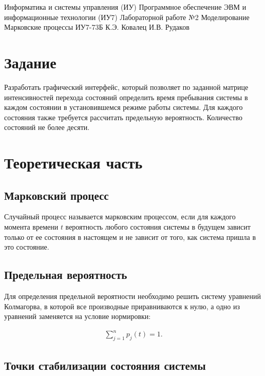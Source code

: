 \documentclass{bmstu}
\begin{document}
\makereporttitle
{Информатика и системы управления (ИУ)}
{Программное обеспечение ЭВМ и информационные технологии (ИУ7)}
{Лабораторной работе №2}
{Моделирование}
{Марковские процессы}
{}
{ИУ7-73Б}
{К.Э. Ковалец}
{И.В. Рудаков}


\setcounter{page}{2}
\renewcommand{\contentsname}{Содержание} 
\tableofcontents

\chapter{Задание}

Разработать графический интерфейс, который позволяет по заданной матрице интенсивностей перехода состояний определить время пребывания системы в каждом состоянии в установившемся режиме работы системы. Для каждого состояния также требуется рассчитать предельную вероятность. Количество состояний не более десяти.


\chapter{Теоретическая часть}

\section{Марковский процесс}

Случайный процесс называется марковским процессом, если для каждого момента времени $t$ вероятность любого состояния системы в будущем зависит только от ее состояния в настоящем и не зависит от того, как система пришла в это состояние.

\section{Предельная вероятность}

Для определения предельной вероятности необходимо решить систему уравнений Колмагорва, в которой все производные приравниваются к нулю, а одно из уравнений заменяется на условие нормировки:

\begin{equation}
    \begin{aligned}
        \sum_{j = 1}^{n} p_{j}(t) = 1.
    \end{aligned}
\end{equation}

\section{Точки стабилизации состояния системы}
\end{document}
